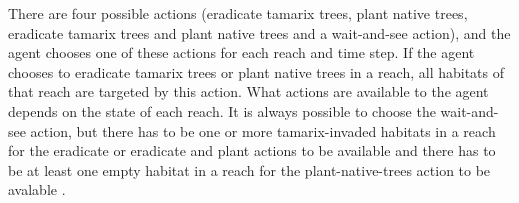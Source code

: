 There are four possible actions (eradicate tamarix trees, plant native trees,
eradicate tamarix trees and plant native trees and a wait-and-see action),
and the agent chooses one of these actions for each reach and time step. If the 
agent chooses to eradicate tamarix trees or plant native trees in a reach, 
all habitats of that reach are targeted by this action. What
actions are available to the agent depends on the state of each reach. It is
always possible to choose the wait-and-see action, but there has to be one
or more tamarix-invaded habitats in a reach for the eradicate or eradicate and
plant actions to be available and there has to be at least one empty habitat in
a reach for the plant-native-trees action to be avalable
\parencite{invasiveSpecis2014:Online}.  
